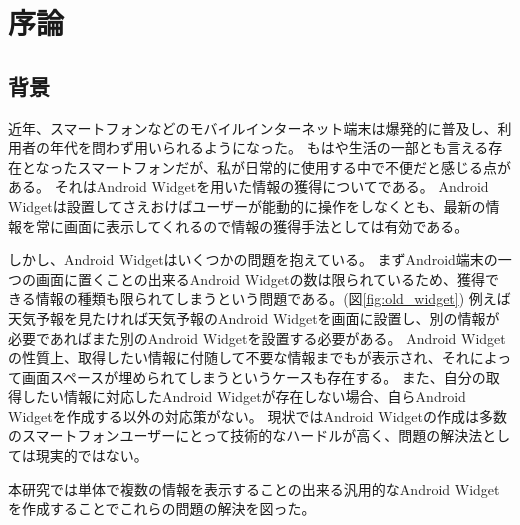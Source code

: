 \chapter{序論}
\label{chap:introduction}
\section{背景}


近年、スマートフォンなどのモバイルインターネット端末は爆発的に普及し、利用者の年代を問わず用いられるようになった。
もはや生活の一部とも言える存在となったスマートフォンだが、私が日常的に使用する中で不便だと感じる点がある。
それはAndroid Widgetを用いた情報の獲得についてである。
Android Widgetは設置してさえおけばユーザーが能動的に操作をしなくとも、最新の情報を常に画面に表示してくれるので情報の獲得手法としては有効である。

しかし、Android Widgetはいくつかの問題を抱えている。
まずAndroid端末の一つの画面に置くことの出来るAndroid Widgetの数は限られているため、獲得できる情報の種類も限られてしまうという問題である。(図\ref{fig:old_widget})
例えば天気予報を見たければ天気予報のAndroid Widgetを画面に設置し、別の情報が必要であればまた別のAndroid Widgetを設置する必要がある。
Android Widgetの性質上、取得したい情報に付随して不要な情報までもが表示され、それによって画面スペースが埋められてしまうというケースも存在する。
また、自分の取得したい情報に対応したAndroid Widgetが存在しない場合、自らAndroid Widgetを作成する以外の対応策がない。
現状ではAndroid Widgetの作成は多数のスマートフォンユーザーにとって技術的なハードルが高く、問題の解決法としては現実的ではない。

本研究では単体で複数の情報を表示することの出来る汎用的なAndroid Widgetを作成することでこれらの問題の解決を図った。

